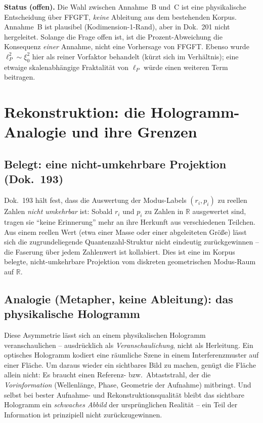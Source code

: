 \medskip

\noindent
\textbf{Status (offen).} Die Wahl zwischen Annahme~B und~C ist eine
physikalische Entscheidung über FFGFT, \emph{keine} Ableitung aus dem
bestehenden Korpus. Annahme~B ist plausibel (Kodimension-1-Rand), aber in
Dok.~201 nicht hergeleitet. Solange die Frage offen ist, ist die
Prozent-Abweichung die Konsequenz \emph{einer} Annahme, nicht eine Vorhersage
von FFGFT. Ebenso wurde $\ell_P^2 \sim \xi_0^2$ hier als reiner Vorfaktor
behandelt (kürzt sich im Verhältnis); eine etwaige skalenabhängige
Fraktalität von $\ell_P$ würde einen weiteren Term beitragen.

\section{Rekonstruktion: die Hologramm-Analogie und ihre Grenzen}

\subsection*{Belegt: eine nicht-umkehrbare Projektion (Dok.~193)}

Dok.~193 hält fest, dass die Auswertung der Modus-Labels $(r_i, p_i)$ zu
reellen Zahlen \emph{nicht umkehrbar} ist: Sobald $r_i$ und $p_i$ zu Zahlen
in $\mathbb{R}$ ausgewertet sind, tragen sie \enquote{keine Erinnerung} mehr
an ihre Herkunft aus verschiedenen Teilchen. Aus einem reellen Wert (etwa
einer Masse oder einer abgeleiteten Größe) lässt sich die zugrundeliegende
Quantenzahl-Struktur nicht eindeutig zurückgewinnen -- die Faserung über
jedem Zahlenwert ist kollabiert. Dies ist eine im Korpus belegte,
nicht-umkehrbare Projektion vom diskreten geometrischen Modus-Raum auf
$\mathbb{R}$.

\subsection*{Analogie (Metapher, keine Ableitung): das physikalische Hologramm}

Diese Asymmetrie lässt sich an einem physikalischen Hologramm veranschaulichen
-- ausdrücklich als \emph{Veranschaulichung}, nicht als Herleitung. Ein
optisches Hologramm kodiert eine räumliche Szene in einem Interferenzmuster
auf einer Fläche. Um daraus wieder ein sichtbares Bild zu machen, genügt die
Fläche allein nicht: Es braucht einen Referenz- bzw.\ Abtaststrahl, der die
\emph{Vorinformation} (Wellenlänge, Phase, Geometrie der Aufnahme) mitbringt.
Und selbst bei bester Aufnahme- und Rekonstruktionsqualität bleibt das
sichtbare Hologramm ein \emph{schwaches Abbild} der ursprünglichen Realität --
ein Teil der Information ist prinzipiell nicht zurückzugewinnen.

